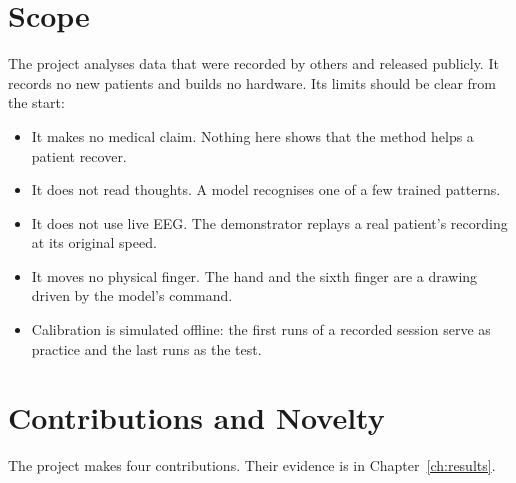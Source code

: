 \section{Scope}\label{sec:intro-scope}

The project analyses data that were recorded by others and released publicly. It records
no new patients and builds no hardware. Its limits should be clear from the start:
\begin{itemize}
  \item It makes no medical claim. Nothing here shows that the method helps a patient
  recover.
  \item It does not read thoughts. A model recognises one of a few trained patterns.
  \item It does not use live EEG. The demonstrator replays a real patient's recording at
  its original speed.
  \item It moves no physical finger. The hand and the sixth finger are a drawing driven
  by the model's command.
  \item Calibration is simulated offline: the first runs of a recorded session serve as
  practice and the last runs as the test.
\end{itemize}

\section{Contributions and Novelty}\label{sec:intro-contrib}

The project makes four contributions. Their evidence is in Chapter~\ref{ch:results}.


